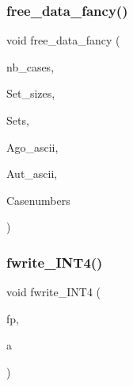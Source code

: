 \mbox{\label{util_8_c_afccd789a47e6a92a71541a250350bd64}} 
\subsubsection{\texorpdfstring{free\+\_\+data\+\_\+fancy()}{free\_data\_fancy()}}
{\footnotesize\ttfamily void free\+\_\+data\+\_\+fancy (\begin{DoxyParamCaption}\item[{\mbox{\hyperlink{galois_8h_a09fddde158a3a20bd2dcadb609de11dc}{I\+NT}}}]{nb\+\_\+cases,  }\item[{\mbox{\hyperlink{galois_8h_a09fddde158a3a20bd2dcadb609de11dc}{I\+NT}} $\ast$}]{Set\+\_\+sizes,  }\item[{\mbox{\hyperlink{galois_8h_a09fddde158a3a20bd2dcadb609de11dc}{I\+NT}} $\ast$$\ast$}]{Sets,  }\item[{\mbox{\hyperlink{galois_8h_ab6cc7b4aeb6ea31aba2b3fbfc83ff5e6}{B\+Y\+TE}} $\ast$$\ast$}]{Ago\+\_\+ascii,  }\item[{\mbox{\hyperlink{galois_8h_ab6cc7b4aeb6ea31aba2b3fbfc83ff5e6}{B\+Y\+TE}} $\ast$$\ast$}]{Aut\+\_\+ascii,  }\item[{\mbox{\hyperlink{galois_8h_a09fddde158a3a20bd2dcadb609de11dc}{I\+NT}} $\ast$}]{Casenumbers }\end{DoxyParamCaption})}

\mbox{\label{util_8_c_a2e1091b3187c01029a1a1453ce9e8639}} 
\subsubsection{\texorpdfstring{fwrite\+\_\+\+I\+N\+T4()}{fwrite\_INT4()}}
{\footnotesize\ttfamily void fwrite\+\_\+\+I\+N\+T4 (\begin{DoxyParamCaption}\item[{F\+I\+LE $\ast$}]{fp,  }\item[{\mbox{\hyperlink{galois_8h_a09fddde158a3a20bd2dcadb609de11dc}{I\+NT}}}]{a }\end{DoxyParamCaption})}

\mbox{\label{util_8_c_a3097dee262bebe614d11c8fc47e414d3}} 

